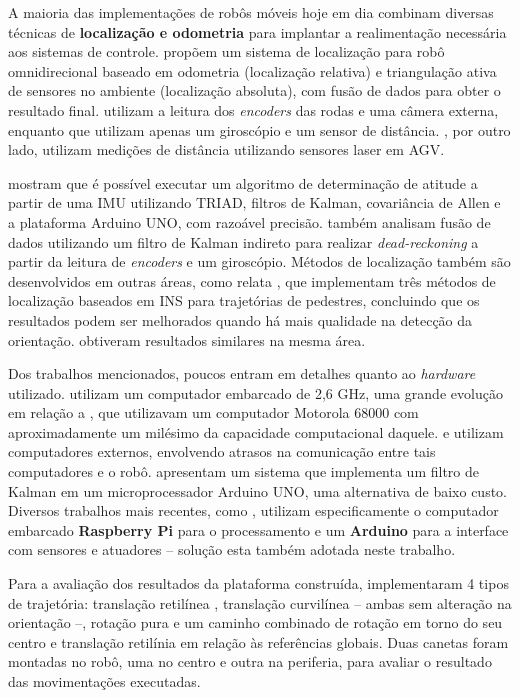 A maioria das implementações de robôs móveis hoje em dia combinam diversas técnicas de \textbf{localização e odometria} para implantar a realimentação necessária aos sistemas de controle. \cite{ginzburg2013indoor} propõem um sistema de localização para robô omnidirecional baseado em odometria (localização relativa) e triangulação ativa de sensores no ambiente (localização absoluta), com fusão de dados para obter o resultado final. \cite{rojas2006holonomic} utilizam a leitura dos \emph{encoders} das rodas e uma câmera externa, enquanto que \cite{garcia2015gyro} utilizam apenas um giroscópio e um sensor de distância. \cite{rohrig2010laser}, por outro lado, utilizam medições de distância utilizando sensores laser em AGV.

\cite{lowcostIMU} mostram que é possível executar um algoritmo de determinação de atitude a partir de uma IMU utilizando TRIAD, filtros de Kalman, covariância de Allen e a plataforma Arduino UNO, com razoável precisão. \cite{park1996dead} também analisam fusão de dados utilizando um filtro de Kalman indireto para realizar \emph{dead-reckoning} a partir da leitura de \emph{encoders} e um giroscópio. Métodos de localização também são desenvolvidos em outras áreas, como relata \cite{jimenez2009comparison}, que implementam três métodos de localização baseados em INS para trajetórias de pedestres, concluindo que os resultados podem ser melhorados quando há mais qualidade na detecção da orientação. \cite{steinhoff2010pocket} obtiveram resultados similares na mesma área.

Dos trabalhos mencionados, poucos entram em detalhes quanto ao \emph{hardware} utilizado. \cite{oubbati2005velocity} utilizam um computador embarcado de 2,6 GHz, uma grande evolução em relação a \cite{feng1989servo}, que utilizavam um computador Motorola 68000 com aproximadamente um milésimo da capacidade computacional daquele. \cite{takemura2007development} e \cite{loh2003mechatronics} utilizam computadores externos, envolvendo atrasos na comunicação entre tais computadores e o robô. \cite{lowcostIMU} apresentam um sistema que implementa um filtro de Kalman em um microprocessador Arduino UNO, uma alternativa de baixo custo. Diversos trabalhos mais recentes, como \cite{krinkin2015design}, utilizam especificamente o computador embarcado \textbf{Raspberry Pi} para o processamento e um \textbf{Arduino} para a interface com sensores e atuadores -- solução esta também adotada neste trabalho.

Para a avaliação dos resultados da plataforma construída, \cite{loh2003mechatronics} implementaram 4 tipos de trajetória: translação retilínea , translação curvilínea -- ambas sem alteração na orientação --, rotação pura e um caminho combinado de rotação em torno do seu centro e translação retilínia em relação às referências globais. Duas canetas foram montadas no robô, uma no centro e outra na periferia, para avaliar o resultado das movimentações executadas.
